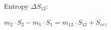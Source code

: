 Entropy \( \Delta S_{12} \):  

\( m_2 \cdot S_2 - m_1 \cdot S_1 = m_{12} \cdot S_{12} + \dot{S}_{erz} \)